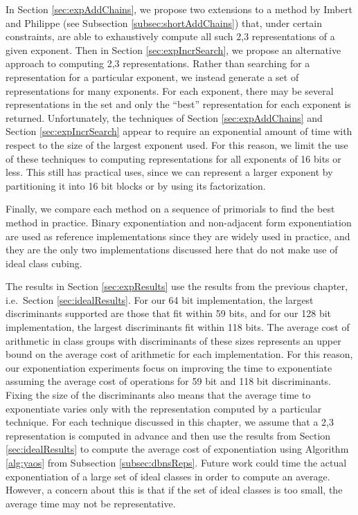 \documentclass{ucalgthes1}
\theoremstyle{definition}
\begin{document}
In Section \ref{sec:expAddChains}, we propose two extensions to a method by Imbert and Philippe \mbox{\cite[\S 3]{Imbert2010b}} (see Subsection \ref{subsec:shortAddChains}) that, under certain constraints, are able to exhaustively compute all such 2,3 representations of a given exponent.  Then in Section \ref{sec:expIncrSearch}, we propose an alternative approach to computing 2,3 representations.  Rather than searching for a representation for a particular exponent, we instead generate a set of representations for many exponents.  For each exponent, there may be several representations in the set and only the ``best'' representation for each exponent is returned.  Unfortunately, the techniques of Section \ref{sec:expAddChains} and Section \ref{sec:expIncrSearch} appear to require an exponential amount of time with respect to the size of the largest exponent used.  For this reason, we limit the use of these techniques to computing representations for all exponents of 16 bits or less.  This still has practical uses, since we can represent a larger exponent by partitioning it into 16 bit blocks or by using its factorization.

Finally, we compare each method on a sequence of primorials to find the best method in practice.  Binary exponentiation and non-adjacent form exponentiation are used as reference implementations since they are widely used in practice, and they are the only two implementations discussed here that do not make use of ideal class cubing.

The results in Section \ref{sec:expResults} use the results from the previous chapter, i.e.\ Section \ref{sec:idealResults}.  For our 64 bit implementation, the largest discriminants supported are those that fit within 59 bits, and for our 128 bit implementation, the largest discriminants fit within 118 bits.  The average cost of arithmetic in class groups with discriminants of these sizes represents an upper bound on the average cost of arithmetic for each implementation.  For this reason, our exponentiation experiments focus on improving the time to exponentiate assuming the average cost of operations for 59 bit and 118 bit discriminants.  Fixing the size of the discriminants also means that the average time to exponentiate varies only with the representation computed by a particular technique.  For each technique discussed in this chapter, we assume that a 2,3 representation is computed in advance and then use the results from Section \ref{sec:idealResults} to compute the average cost of exponentiation using Algorithm \ref{alg:yaos} from Subsection \ref{subsec:dbnsReps}.  Future work could time the actual exponentiation of a large set of ideal classes in order to compute an average.  However, a concern about this is that if the set of ideal classes is too small, the average time may not be representative.
\end{document}
